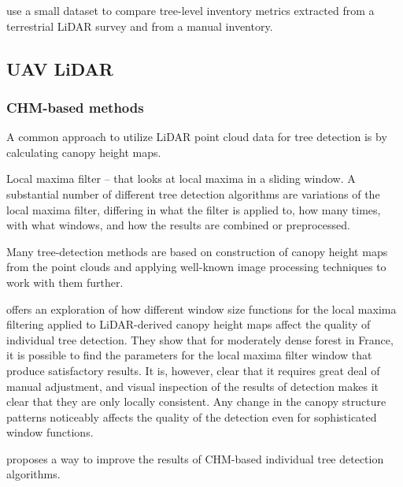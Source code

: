 \cite{vianaTimberVolumeEstimation2022} use a small dataset to compare tree-level inventory metrics extracted from a terrestrial LiDAR survey and from a manual inventory.

\subsection{UAV LiDAR}

\subsubsection{CHM-based methods}

A common approach to utilize LiDAR point cloud data for tree detection is by calculating canopy height maps.

Local maxima filter – that looks at local maxima in a sliding window.
A substantial number of different tree detection algorithms are variations of the local maxima filter, differing in what the filter is applied to, how many times, with what windows, and how the results are combined or preprocessed.

Many tree-detection methods are based on construction of canopy height maps from the point clouds and applying well-known image processing techniques to work with them further.

\cite{doussExtractionIndividualTrees2022} offers an exploration of how different window size functions for the local maxima filtering applied to LiDAR-derived canopy height maps affect the quality of individual tree detection.
They show that for moderately dense forest in France, it is possible to find the parameters for the local maxima filter window that produce satisfactory results.
It is, however, clear that it requires great deal of manual adjustment, and visual inspection of the results of detection makes it clear that they are only locally consistent.
Any change in the canopy structure patterns noticeably affects the quality of the detection even for sophisticated window functions.

\cite{lisiewiczCorrectingResultsCHMBased2022} proposes a way to improve the results of CHM-based individual tree detection algorithms.
